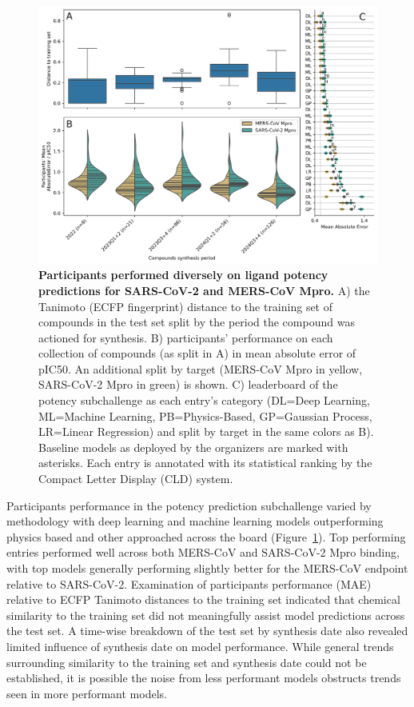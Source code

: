 \documentclass[journal=jcim,manuscript=article]{achemso}
\begin{document}
{\begin{figure}
    \includegraphics[scale=0.6]{04_figs_leaderboards/potency_leaderboards_and_progressions.png}
  \caption{\textbf{Participants performed diversely on ligand potency predictions for SARS-CoV-2 and MERS-CoV Mpro.} A) the Tanimoto (ECFP fingerprint) distance to the training set of compounds in the test set split by the period the compound was actioned for synthesis. B) participants' performance on each collection of compounds (as split in A) in mean absolute error of pIC50. An additional split by target (MERS-CoV Mpro in yellow, SARS-CoV-2 Mpro in green) is shown. C) leaderboard of the potency subchallenge as each entry's category (DL=Deep Learning, ML=Machine Learning, PB=Physics-Based, GP=Gaussian Process, LR=Linear Regression) and split by target in the same colors as B). Baseline models as deployed by the organizers are marked with asterisks. Each entry is annotated with its statistical ranking by the Compact Letter Display (CLD) system\cite{cld_algorithm_2004}.}
  \label{fgr:potency_leaderboards}
\end{figure}

Participants performance in the potency prediction subchallenge varied by methodology with deep learning and machine learning models outperforming physics based and other approached across the board (Figure~\ref{fgr:potency_leaderboards}). Top performing entries performed well across both MERS-CoV and SARS-CoV-2 Mpro binding, with top models generally performing slightly better for the MERS-CoV endpoint relative to SARS-CoV-2. Examination of participants performance (MAE) relative to ECFP Tanimoto distances to the training set indicated that chemical similarity to the training set did not meaningfully assist model predictions across the test set. A time-wise breakdown of the test set by synthesis date also revealed limited influence of synthesis date on model performance. While general trends surrounding similarity to the training set and synthesis date could not be established, it is possible the noise from less performant models obstructs trends seen in more performant models.


}
\end{document}
